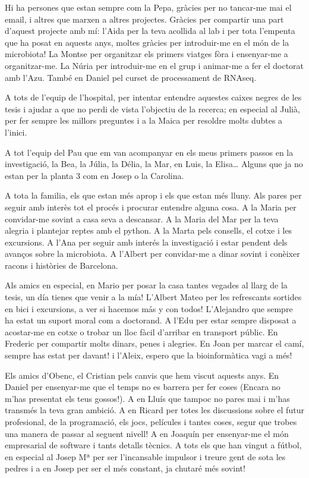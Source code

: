 \documentclass[
  12pt,
  a4paper,
  twoside,
  openright]{book}
\begin{document}
Hi ha persones que estan sempre com la Pepa, gràcies per no tancar-me mai el email, i altres que marxen a altres projectes.
Gràcies per compartir una part d'aquest projecte amb mí:
l'Aida per la teva acollida al lab i per tota l'empenta que ha posat en aquests anys, moltes gràcies per introduir-me en el món de la microbiota!
La Montse per organitzar els primers viatges fòra i ensenyar-me a organitzar-me.
La Núria per introduir-me en el grup i animar-me a fer el doctorat amb l'Azu.
També en Daniel pel curset de processament de RNAseq.

A tots de l'equip de l'hospital, per intentar entendre aquestes caixes negres de les tesis i ajudar a que no perdi de vista l'objectiu de la recerca; en especial al Julià, per fer sempre les millors preguntes i a la Maica per resoldre molts dubtes a l'inici.

A tot l'equip del Pau que em van acompanyar en els meus primers passos en la investigació, la Bea, la Júlia, la Délia, la Mar, en Luis, la Elisa\ldots{}
Alguns que ja no estan per la planta 3 com en Josep o la Carolina.

A tota la familia, els que estan més aprop i els que estan més lluny.
Als pares per seguir amb interès tot el procés i procurar entendre alguna cosa.
A la Maria per convidar-me sovint a casa seva a descansar.
A la Maria del Mar per la teva alegria i plantejar reptes amb el python.
A la Marta pels consells, el cotxe i les excursions.
A l'Ana per seguir amb interés la investigació i estar pendent dels avanços sobre la microbiota.
A l'Albert per convidar-me a dinar sovint i conèixer racons i històries de Barcelona.

Als amics en especial, en Mario per posar la casa tantes vegades al llarg de la tesis, un día tienes que venir a la mía!
L'Albert Mateo per les refrescants sortides en bici i excursions, a ver si hacemos más y con todos!
L'Alejandro que sempre ha estat un suport moral com a doctorand.
A l'Edu per estar sempre disposat a acostar-me en cotxe o trobar un lloc fàcil d'arribar en transport públic.
En Frederic per compartir molts dinars, penes i alegries.
En Joan per marcar el camí, sempre has estat per davant! i l'Aleix, espero que la bioinformàtica vagi a més!

Els amics d'Obenc, el Cristian pels canvis que hem viscut aquests anys.
En Daniel per ensenyar-me que el temps no es barrera per fer coses (Encara no m'has presentat els teus gossos!).
A en Lluís que tampoc no pares mai i m'has transmés la teva gran ambició.
A en Ricard per totes les discussions sobre el futur profesional, de la programació, els jocs, películes i tantes coses, segur que trobes una manera de passar al seguent nivell!
A en Joaquín per ensenyar-me el món empresarial de software i tants detalls tècnics.
A tots els que han vingut a fútbol, en especial al Josep Mª per ser l'incansable impulsor i treure gent de sota les pedres i a en Josep per ser el més constant, ja chutaré més sovint!
\end{document}
